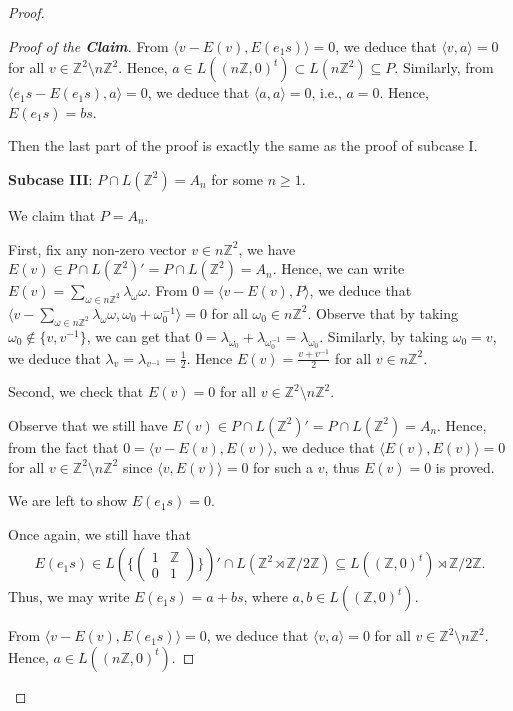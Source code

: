 \documentclass[12pt]{amsart}
\theoremstyle{definition}
\theoremstyle{remark}
\begin{document}
\begin{proof}
\begin{proof}[Proof of the \textbf{Claim}]
From $\langle v-E(v), E(e_1s)\rangle=0$, we deduce that $\langle v, a \rangle=0$ for all $v\in \mathbb{Z}^2\setminus {n\mathbb{Z}^2}$. Hence, $a\in L((n\mathbb{Z},0)^t)\subset L(n\mathbb{Z}^2)\subseteq P$. Similarly, from $\langle e_1s-E(e_1s), a \rangle=0$, we deduce that $\langle a, a \rangle=0$, i.e., $a=0$.
Hence, $E(e_1s)=bs$.

Then the last part of the proof is exactly the same as the proof of subcase I. 


\textbf{Subcase III}: $P\cap L(\mathbb{Z}^2)=A_n$ for some $n\geq 1$.

We claim that $P=A_n$. 

First, fix any non-zero vector $v\in n\mathbb{Z}^2$, we have $E(v)\in P\cap L(\mathbb{Z}^2)'=P\cap L(\mathbb{Z}^2)=A_n$. Hence, we can write $E(v)=\sum\limits_{\omega\in n\mathbb{Z}^2}\lambda_{\omega}\omega$. From $0=\langle v-E(v), P \rangle$, we deduce that $\langle v-\sum\limits_{\omega\in n\mathbb{Z}^2}\lambda_{\omega}\omega, \omega_0+\omega_{0}^{-1} \rangle=0$ for all $\omega_0\in n\mathbb{Z}^2$. Observe that by taking $\omega_0\not\in\{v, v^{-1}\}$, we can get that $0=\lambda_{\omega_0}+\lambda_{\omega_0^{-1}}=\lambda_{\omega_0}.$ Similarly, by taking $\omega_0=v$, we deduce that $\lambda_{v}=\lambda_{v^{-1}}=\frac{1}{2}$. Hence $E(v)=\frac{v+v^{-1}}{2}$ for all $v\in n\mathbb{Z}^2$.

Second, we check that $E(v)=0$ for all $v\in\mathbb{Z}^2\setminus {n\mathbb{Z}^2}$.

Observe that we still have $E(v)\in P\cap L(\mathbb{Z}^2)'=P\cap L(\mathbb{Z}^2)=A_n$. Hence, from the fact that $0=\langle v-E(v), E(v) \rangle$, we deduce that $\langle E(v), E(v)\rangle=0$ for all $v\in \mathbb{Z}^2\setminus {n\mathbb{Z}^2}$ since $\langle v, E(v) \rangle=0$ for such a $v$, thus $E(v)=0$ is proved.

We are left to show $E(e_1s)=0$. 

Once again, we still have 
that
\begin{align*}
E(e_1s)\in L(\{\begin{pmatrix}
1&\mathbb{Z}\\
0&1
\end{pmatrix} \})'\cap L(\mathbb{Z}^2\rtimes \mathbb{Z}/{2\mathbb{Z}})\subseteq L((\mathbb{Z}, 0)^t)\rtimes \mathbb{Z}/{2\mathbb{Z}}.
\end{align*}
Thus, we may write $E(e_1s)=a+bs$, where $a, b\in L((\mathbb{Z}, 0)^t)$.

From $\langle v-E(v), E(e_1s)\rangle=0$, we deduce that $\langle v, a \rangle=0$ for all $v\in \mathbb{Z}^2\setminus {n\mathbb{Z}^2}$. Hence, $a\in L((n\mathbb{Z},0)^t)$.


\end{proof}
\end{proof}
\end{document}
